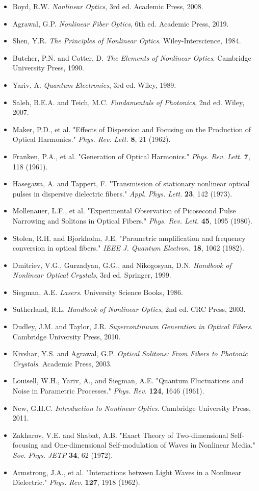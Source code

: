 \documentclass[a4paper, 11pt]{article}
\begin{document}
\begin{itemize}
\item Boyd, R.W. \textit{Nonlinear Optics}, 3rd ed. Academic Press, 2008.
\item Agrawal, G.P. \textit{Nonlinear Fiber Optics}, 6th ed. Academic Press, 2019.
\item Shen, Y.R. \textit{The Principles of Nonlinear Optics}. Wiley-Interscience, 1984.
\item Butcher, P.N. and Cotter, D. \textit{The Elements of Nonlinear Optics}. Cambridge University Press, 1990.
\item Yariv, A. \textit{Quantum Electronics}, 3rd ed. Wiley, 1989.
\item Saleh, B.E.A. and Teich, M.C. \textit{Fundamentals of Photonics}, 2nd ed. Wiley, 2007.
\item Maker, P.D., et al. "Effects of Dispersion and Focusing on the Production of Optical Harmonics."
\textit{Phys. Rev. Lett.} \textbf{8}, 21 (1962).
\item Franken, P.A., et al. "Generation of Optical Harmonics." \textit{Phys. Rev. Lett.} \textbf{7}, 118 (1961).
\item Hasegawa, A. and Tappert, F. "Transmission of stationary nonlinear optical pulses in dispersive
dielectric fibers." \textit{Appl. Phys. Lett.} \textbf{23}, 142 (1973).
\item Mollenauer, L.F., et al. "Experimental Observation of Picosecond Pulse Narrowing and Solitons in
Optical Fibers." \textit{Phys. Rev. Lett.} \textbf{45}, 1095 (1980).
\item Stolen, R.H. and Bjorkholm, J.E. "Parametric amplification and frequency conversion in optical
fibers." \textit{IEEE J. Quantum Electron.} \textbf{18}, 1062 (1982).
\item Dmitriev, V.G., Gurzadyan, G.G., and Nikogosyan, D.N. \textit{Handbook of Nonlinear Optical
Crystals}, 3rd ed. Springer, 1999.
\item Siegman, A.E. \textit{Lasers}. University Science Books, 1986.
\item Sutherland, R.L. \textit{Handbook of Nonlinear Optics}, 2nd ed. CRC Press, 2003.
\item Dudley, J.M. and Taylor, J.R. \textit{Supercontinuum Generation in Optical Fibers}. Cambridge
University Press, 2010.
\item Kivshar, Y.S. and Agrawal, G.P. \textit{Optical Solitons: From Fibers to Photonic Crystals}.
Academic Press, 2003.
\item Louisell, W.H., Yariv, A., and Siegman, A.E. "Quantum Fluctuations and Noise in Parametric
Processes." \textit{Phys. Rev.} \textbf{124}, 1646 (1961).
\item New, G.H.C. \textit{Introduction to Nonlinear Optics}. Cambridge University Press, 2011.
\item Zakharov, V.E. and Shabat, A.B. "Exact Theory of Two-dimensional Self-focusing and One-dimensional
Self-modulation of Waves in Nonlinear Media." \textit{Sov. Phys. JETP} \textbf{34}, 62 (1972).
\item Armstrong, J.A., et al. "Interactions between Light Waves in a Nonlinear Dielectric."
\textit{Phys. Rev.} \textbf{127}, 1918 (1962).
\end{itemize}
\end{document}
